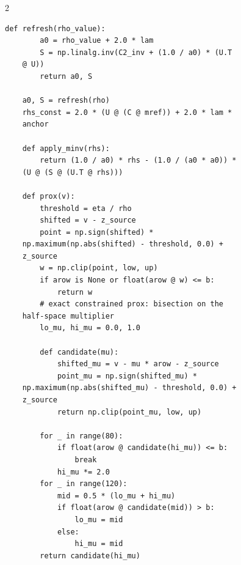 \begin{multicols}{2}
\begin{Verbatim}[fontsize=\scriptsize]
    def refresh(rho_value):
        a0 = rho_value + 2.0 * lam
        S = np.linalg.inv(C2_inv + (1.0 / a0) * (U.T
    @ U))
        return a0, S

    a0, S = refresh(rho)
    rhs_const = 2.0 * (U @ (C @ mref)) + 2.0 * lam *
    anchor

    def apply_minv(rhs):
        return (1.0 / a0) * rhs - (1.0 / (a0 * a0)) *
    (U @ (S @ (U.T @ rhs)))

    def prox(v):
        threshold = eta / rho
        shifted = v - z_source
        point = np.sign(shifted) *
    np.maximum(np.abs(shifted) - threshold, 0.0) +
    z_source
        w = np.clip(point, low, up)
        if arow is None or float(arow @ w) <= b:
            return w
        # exact constrained prox: bisection on the
    half-space multiplier
        lo_mu, hi_mu = 0.0, 1.0

        def candidate(mu):
            shifted_mu = v - mu * arow - z_source
            point_mu = np.sign(shifted_mu) *
    np.maximum(np.abs(shifted_mu) - threshold, 0.0) +
    z_source
            return np.clip(point_mu, low, up)

        for _ in range(80):
            if float(arow @ candidate(hi_mu)) <= b:
                break
            hi_mu *= 2.0
        for _ in range(120):
            mid = 0.5 * (lo_mu + hi_mu)
            if float(arow @ candidate(mid)) > b:
                lo_mu = mid
            else:
                hi_mu = mid
        return candidate(hi_mu)


\end{Verbatim}
\end{multicols}
